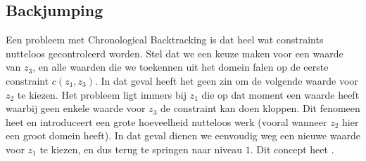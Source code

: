 \subsection{Backjumping}
Een probleem met Chronological Backtracking is dat heel wat constraints nutteloos gecontroleerd worden. Stel dat we een keuze maken voor een waarde van $z_3$, en alle waarden die we toekennen uit het domein falen op de eerste constraint $c\left(z_1,z_3\right)$. In dat geval heeft het geen zin om de volgende waarde voor $z_2$ te kiezen. Het probleem ligt immers bij $z_1$ die op dat moment een waarde heeft waarbij geen enkele waarde voor $z_3$ de constraint kan doen kloppen. Dit fenomeen heet  en introduceert een grote hoeveelheid nutteloos werk (vooral wanneer $z_2$ hier een groot domein heeft). In dat geval dienen we eenvoudig weg een nieuwe waarde voor $z_1$ te kiezen, en dus terug te springen naar niveau $1$. Dit concept heet .
